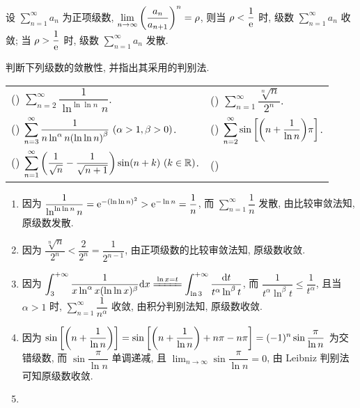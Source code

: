 \begin{theorem}
    设 $\displaystyle \sum_{n=1}^{\infty} a_n$ 为正项级数, $\displaystyle \lim_{n \to \infty}\qty(\dfrac{a_n}{a_{n+1}})^{n}=\rho$,
    则当 $\rho<\dfrac{1}{\mathrm{e}}$ 时, 级数 $\displaystyle \sum_{n=1}^{\infty} a_n$ 收敛; 当 $\rho>\dfrac{1}{\mathrm{e}}$ 时, 级数 $\displaystyle \sum_{n=1}^{\infty} a_n$ 发散.
\end{theorem}

\begin{example}
    判断下列级数的敛散性, 并指出其采用的判别法.
    \setcounter{magicrownumbers}{0}
    \begin{table}[H]
        \centering
        \begin{tabular}{l|l}
            (\rownumber{}) $ \displaystyle \sum_{n=2}^{\infty} \dfrac{1}{\ln ^{\ln\ln n}n} $. & (\rownumber{}) $ \displaystyle \sum_{n=1}^{\infty} \dfrac{\sqrt[n]{n}}{2^n} $.\\
            (\rownumber{}) $ \displaystyle \sum_{n=3}^{\infty} \dfrac{1}{n \ln^{\alpha}n\qty(\ln \ln n)^\beta} ~(\alpha>1,\beta>0)$. & (\rownumber{}) $ \displaystyle \sum_{n=2}^{\infty} \sin\qty[\qty(n+\dfrac{1}{\ln n})\pi] $.\\ 
            (\rownumber{}) $ \displaystyle \sum_{n=1}^{\infty} \qty(\dfrac{1}{\sqrt{n}}-\dfrac{1}{\sqrt{n+1}})\sin(n+k) ~(k\in \mathbb{R})$.& (\rownumber{}) 
        \end{tabular}
    \end{table}
\end{example}
\begin{solution}
    \begin{enumerate}[label=(\arabic{*})]
        \item 因为 $\dfrac{1}{\ln ^{\ln \ln n}n}=\mathrm{e} ^{-(\ln \ln n)^2}>\mathrm{e} ^{-\ln n}=\dfrac{1}{n}$, 而 $ \displaystyle \sum_{n=1}^{\infty} \dfrac{1}{n} $ 发散, 由比较审敛法知, 原级数发散.
        \item 因为 $ \displaystyle \dfrac{\sqrt[n]{n}}{2^n} <\dfrac{2}{2^n}=\dfrac{1}{2^{n-1}}$, 由正项级数的比较审敛法知, 原级数收敛.
        \item 因为 $ \displaystyle \int_{3}^{+\infty} \dfrac{1}{x\ln^\alpha x(\ln\ln x)^\beta} \dd x \xlongequal{\ln x=t}\int_{\ln 3}^{+\infty} \dfrac{\dd t}{t^\alpha\ln^\beta t}$, 而 
        $ \displaystyle \dfrac{1}{t^\alpha\ln^\beta t} \leqslant \dfrac{1}{t^\alpha}$, 且当 $\alpha>1$ 时, $ \displaystyle \sum_{n=1}^{\infty} \dfrac{1}{n^\alpha} $ 收敛, 由积分判别法知, 原级数收敛.
        \item 因为 $ \displaystyle \sin\qty[\qty(n+\dfrac{1}{\ln n})] =\sin\qty[\qty(n+\dfrac{1}{\ln n})+n\pi-n\pi] =(-1)^n\sin\dfrac{\pi}{\ln n}$ 为交错级数, 而 $\sin\dfrac{\pi}{\ln n}$ 单调递减, 且 $ \displaystyle \lim_{n \to \infty} \sin\dfrac{\pi}{\ln n}=0$, 由 Leibniz 判别法可知原级数收敛.
        \item 
    \end{enumerate}
\end{solution}

